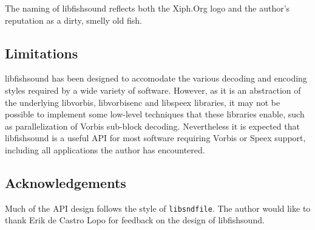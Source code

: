 The naming of libfishsound reflects both the Xiph.Org logo and the author's reputation as a dirty, smelly old fish.\subsection{Limitations}\label{limitations}
libfishsound has been designed to accomodate the various decoding and encoding styles required by a wide variety of software. However, as it is an abstraction of the underlying libvorbis, libvorbisenc and libspeex libraries, it may not be possible to implement some low-level techniques that these libraries enable, such as parallelization of Vorbis sub-block decoding. Nevertheless it is expected that libfishsound is a useful API for most software requiring Vorbis or Speex support, including all applications the author has encountered.\subsection{Acknowledgements}\label{acknowledgements}
Much of the API design follows the style of {\tt libsndfile}. The author would like to thank Erik de Castro Lopo for feedback on the design of libfishsound. 

